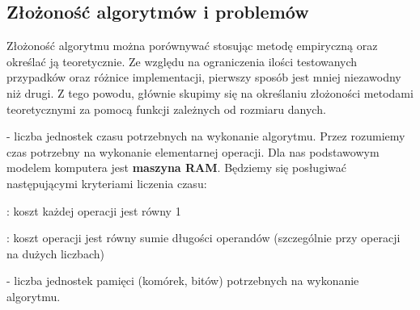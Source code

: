 \subsection{Złożoność algorytmów i problemów}

Złożoność algorytmu można porównywać stosując metodę empiryczną oraz określać ją teoretycznie. Ze względu na ograniczenia ilości testowanych przypadków oraz różnice implementacji, pierwszy sposób jest mniej niezawodny niż drugi. Z tego powodu, głównie skupimy się na określaniu złożoności metodami teoretycznymi za pomocą funkcji zależnych od rozmiaru danych.
\medskip

 - liczba jednostek czasu potrzebnych na wykonanie algorytmu. Przez  rozumiemy czas potrzebny na wykonanie elementarnej operacji. Dla nas podstawowym modelem komputera jest \textbf{maszyna RAM}. Będziemy się posługiwać następującymi kryteriami liczenia czasu:

\indent \point {}: koszt każdej operacji jest równy 1

\indent \point {}: koszt operacji jest równy sumie długości operandów (szczególnie przy operacji na dużych liczbach)

 - liczba jednostek pamięci (komórek, bitów) potrzebnych na wykonanie algorytmu.